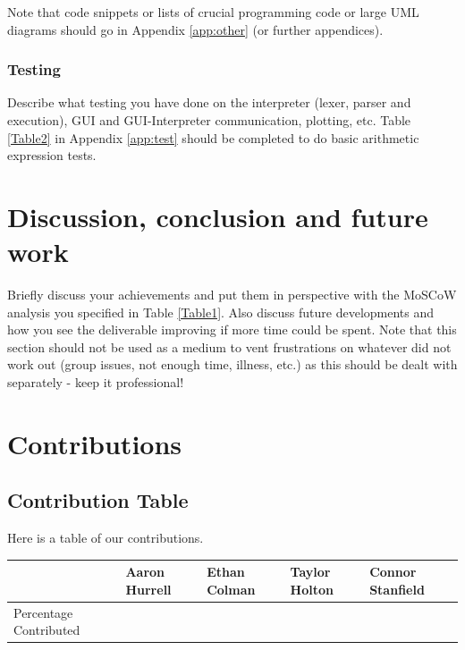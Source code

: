 \documentclass[a4paper, oneside, 11pt]{report}
\begin{document}
Note that code snippets or lists of crucial programming code or large UML diagrams should go in Appendix \ref{app:other} (or further appendices).

\subsection{Testing}

Describe what testing you have done on the interpreter (lexer, parser and execution), GUI and GUI-Interpreter communication, plotting, etc. Table \ref{Table2} in Appendix \ref{app:test} should be completed to do basic arithmetic expression tests.


\chapter{Discussion, conclusion and future work}

Briefly discuss your achievements and put them in perspective with the MoSCoW analysis you specified in Table \ref{Table1}. Also discuss future developments and how you see the deliverable improving if more time could be spent. Note that this section should not be used as a medium to vent frustrations on whatever did not work out (group issues, not enough time, illness, etc.) as this should be dealt with separately - keep it professional!






\appendix
\chapter{Contributions} 
\section{Contribution Table}
Here is a table of our contributions. \\

\begin{table}[h]
\begin{tabular}{|l|l|l|l|l|}
\hline
                       & Aaron Hurrell & Ethan Colman & Taylor Holton & Connor Stanfield \\ \hline
Percentage Contributed &               &              &               &                  \\ \hline
\end{tabular}
\end{table}
\end{document}
